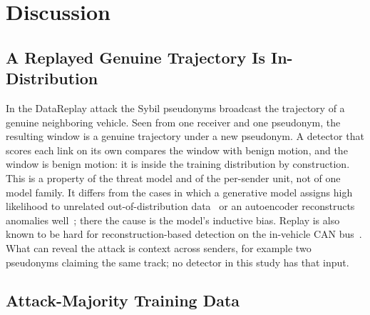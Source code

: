 \section{Discussion}\label{sec:discussion}

\subsection{A Replayed Genuine Trajectory Is In-Distribution}\label{sec:disc-replay}

In the DataReplay attack the Sybil pseudonyms broadcast the trajectory of a genuine neighboring vehicle. Seen from
one receiver and one pseudonym, the resulting window is a genuine trajectory under a new pseudonym. A detector that
scores each link on its own compares the window with benign motion, and the window is benign motion: it is inside
the training distribution by construction.  This is a property of the threat model and of the
per-sender unit, not of one model family. It differs from the cases in which a generative model assigns high
likelihood to unrelated out-of-distribution data~\cite{nalisnick2019deep,kirichenko2020normalizing} or an
autoencoder reconstructs anomalies well~\cite{gong2019memorizing,yoon2021autoencoding}; there the cause is the
model's inductive bias. Replay is also known to be hard for reconstruction-based detection on the in-vehicle
CAN bus~\cite{longari2022candito,hanselmann2020canet}. What can reveal the attack is context across senders, for
example two pseudonyms claiming the same track; no detector in this study has that input.

\subsection{Attack-Majority Training Data}\label{sec:disc-majority}

